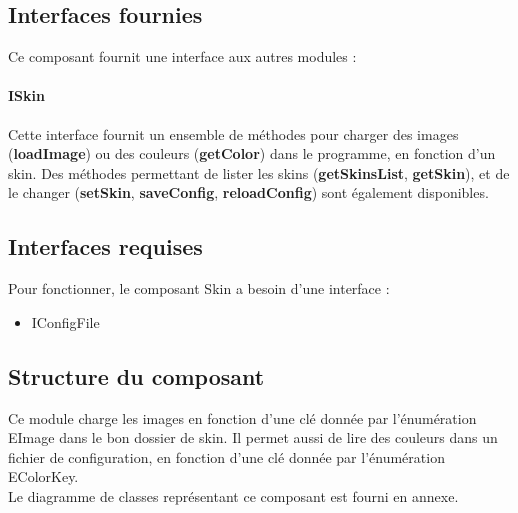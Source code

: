 \subsection{Interfaces fournies}

Ce composant fournit une interface aux autres modules :

\paragraph{ISkin}

Cette interface fournit un ensemble de méthodes pour charger des images (\textbf{loadImage}) ou des couleurs (\textbf{getColor}) dans le programme, en fonction d'un skin. Des méthodes permettant de lister les skins (\textbf{getSkinsList}, \textbf{getSkin}), et de le changer (\textbf{setSkin}, \textbf{saveConfig}, \textbf{reloadConfig}) sont également disponibles.

\subsection{Interfaces requises}

Pour fonctionner, le composant Skin a besoin d'une interface :
\begin{itemize}
    \item IConfigFile
\end{itemize}

\subsection{Structure du composant}

Ce module charge les images en fonction d'une clé donnée par l'énumération EImage dans le bon dossier de skin. Il permet aussi de lire des couleurs  dans un fichier de configuration, en fonction d'une clé donnée par l'énumération EColorKey.\\

Le diagramme de classes représentant ce composant est fourni en annexe.